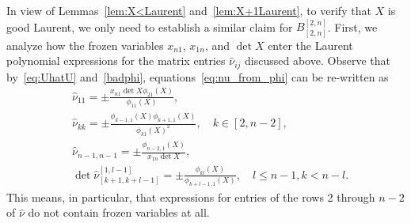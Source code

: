 \documentclass{amsart}
\theoremstyle{definition}
\theoremstyle{remark}
\numberwithin{equation}{section}
\numberwithin{theorem}{section}
\begin{document}
In view of  Lemmas~\ref{lem:X<Laurent} and~\ref{lem:X+1Laurent}, to verify that $X$ is good Laurent, we only need to establish a similar claim for $B^{[2,n]}_{[2,n]}$. First, we analyze how  the frozen variables $x_{n1}$, $x_{1n}$,
 and $\det X$ enter the Laurent polynomial expressions for the matrix entries $\hat\nu_{ij}$ discussed above. Observe that by~\eqref{eq:UhatU} and~\eqref{badphi}, equations~\eqref{eq:nu_from_phi} can be re-written as
\begin{equation}\label{eq:nu_from_phiX}
\begin{aligned}
&\hat\nu_{11} = \pm \frac{x_{n1} \det X \phi_{21}(X)}{ \phi_{11}(X)},\\
&\hat\nu_{kk} = \pm\frac{\phi_{k-1,1}(X)\phi_{k+1,1}(X)}{\phi_{k1}(X)^2},\quad k\in [2,n-2],\\ 
&\hat\nu_{n-1,n-1} = \pm \frac{\phi_{n-2,1}(X)}{x_{1n}\det X},\\ 
& \det \hat\nu^{[1,l-1]}_{[k+1,k+l-1]}=\pm \frac{\phi_{kl}(X)}{\phi_{k+l-1,1}(X)}, \quad l\leq n-1, k < n-l.
\end{aligned}
\end{equation}
This means, in particular, that expressions for entries of the rows 2 through $n-2$ of $\hat\nu$ do not contain frozen variables at all. 
\end{document}
